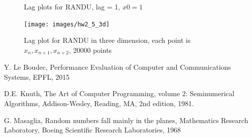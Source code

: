 \documentclass[10pt]{article}
\begin{document}
\begin{figure}[h]
  \centering
  \caption{Lag plots for RANDU, lag = 1, $x0 = 1$}
  \label{fig:randu2d}
\end{figure}

\begin{figure}[h]
  \centering
  \texttt{[image: images/hw2\_5\_3d]}
  \caption{Lag plot for RANDU in three dimension, each point is $x_n, x_{n+1}, x_{n+2}$, 20000 points}
  \label{fig:randu3d}
\end{figure}

\FloatBarrier

\begin{thebibliography}{10}

Y. Le Boudec, Performance Evaluation of Computer and Communications Systems, EPFL, 2015

D.E. Knuth, The Art of Computer Programming, volume 2: Seminumerical Algorithms, Addison-Wesley, Reading, MA, 2nd edition, 1981.

G. Masaglia, Random numbers fall mainly in the planes, Mathematics Research Laboratory, Boeing Scientific Research Laboratories, 1968


\end{thebibliography}
\end{document}

